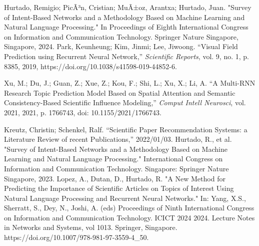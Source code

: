 \documentclass[runningheads]{llncs}
\begin{document}
\begin{thebibliography}{00}
    
    Hurtado, Remigio; PicÃ³n, Cristian; MuÃ±oz, Arantxa; Hurtado, Juan.
    "Survey of Intent-Based Networks and a Methodology Based on Machine Learning and Natural Language Processing."
    In Proceedings of Eighth International Congress on Information and Communication Technology.
    Springer Nature Singapore, Singapore, 2024.
    Park, Keunheung; Kim, Jinmi; Lee, Jiwoong. 
    ``Visual Field Prediction using Recurrent Neural Network,'' 
    \emph{Scientific Reports}, 
    vol. 9, no. 1, p. 8385, 
    2019, 
    https://doi.org/10.1038/s41598-019-44852-6.
    
    Xu, M.; Du, J.; Guan, Z.; Xue, Z.; Kou, F.; Shi, L.; Xu, X.; Li, A. 
    ``A Multi-RNN Research Topic Prediction Model Based on Spatial Attention and Semantic Consistency-Based Scientific Influence Modeling,'' 
    \emph{Comput Intell Neurosci}, 
    vol. 2021, 
    2021, 
    p. 1766743, 
    doi: 10.1155/2021/1766743.
    
    Kreutz, Christin; Schenkel, Ralf.
    ``Scientific Paper Recommendation Systems: a Literature Review of recent Publications,''
    2022/01/03.
	 Hurtado, R., et al. "Survey of Intent-Based Networks and a Methodology Based on Machine Learning and Natural Language Processing." International Congress on Information and Communication Technology. Singapore: Springer Nature Singapore, 2023.
     Lopez, A., Dutan, D., Hurtado, R. "A New Method for Predicting the Importance of Scientific Articles on Topics of Interest Using Natural Language Processing and Recurrent Neural Networks." In: Yang, X.S., Sherratt, S., Dey, N., Joshi, A. (eds) Proceedings of Ninth International Congress on Information and Communication Technology. ICICT 2024 2024. Lecture Notes in Networks and Systems, vol 1013. Springer, Singapore. https://doi.org/10.1007/978-981-97-3559-4\_50.
\end{thebibliography}
\end{document}
